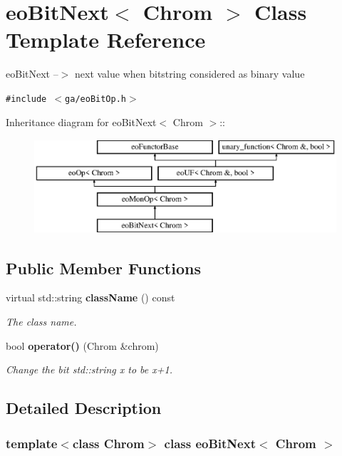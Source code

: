 \section{eo\-Bit\-Next$<$ Chrom $>$ Class Template Reference}
\label{classeo_bit_next}
eo\-Bit\-Next --$>$ next value when bitstring considered as binary value  


{\tt \#include $<$ga/eo\-Bit\-Op.h$>$}

Inheritance diagram for eo\-Bit\-Next$<$ Chrom $>$::\begin{figure}[H]
\begin{center}
\leavevmode
\includegraphics[height=3.50548cm]{classeo_bit_next}
\end{center}
\end{figure}
\subsection*{Public Member Functions}
\begin{CompactItemize}
\item 
virtual std::string {\bf class\-Name} () const \label{classeo_bit_next_a0}

\begin{CompactList}\small\item\em The class name. \item\end{CompactList}\item 
bool {\bf operator()} (Chrom \&chrom)
\begin{CompactList}\small\item\em Change the bit std::string x to be x+1. \item\end{CompactList}\end{CompactItemize}


\subsection{Detailed Description}
\subsubsection*{template$<$class Chrom$>$ class eo\-Bit\-Next$<$ Chrom $>$}

